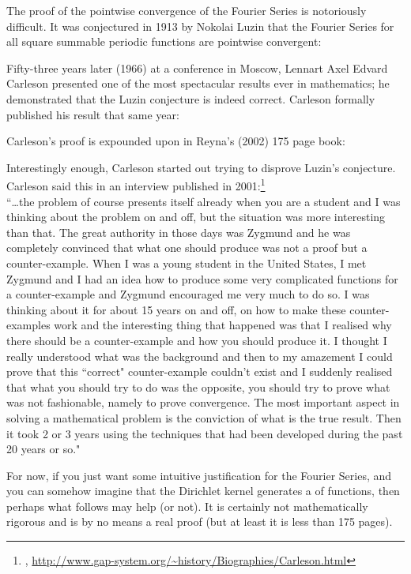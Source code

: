 \begin{proofns}
The proof of the pointwise convergence of the Fourier Series is notoriously difficult.
It was conjectured in 1913 by Nokolai Luzin that the Fourier Series for all square summable periodic functions 
are pointwise convergent:
\citePbullet\quad{}

Fifty-three years later (1966) at a conference in Moscow, Lennart Axel Edvard Carleson presented one of the most spectacular 
results ever in mathematics; he demonstrated that the Luzin conjecture is indeed correct.
Carleson formally published his result that same year:
\citePbullet\quad{}

Carleson's proof is expounded upon in Reyna's (2002) 175 page book:
\citebullet\quad{}

Interestingly enough, Carleson started out trying to disprove Luzin's conjecture.
Carleson said this in an interview published in 2001:\footnote{
  ,
  \url{http://www.gap-system.org/~history/Biographies/Carleson.html}
  }
\\
``\ldots the problem of course presents itself already when you are a student and I was thinking about the problem on and off, 
  but the situation was more interesting than that. 
  The great authority in those days was Zygmund and he was completely convinced that what one should produce was not a proof 
  but a counter-example. 
  When I was a young student in the United States, 
  I met Zygmund and I had an idea how to produce some very complicated functions for a counter-example 
  and Zygmund encouraged me very much to do so. 
  I was thinking about it for about 15 years on and off, on how to make these counter-examples work 
  and the interesting thing that happened was that I realised why there should be a counter-example and how you should produce it. 
  I thought I really understood what was the background and then to my amazement I could prove that 
  this ``correct" counter-example couldn't exist and I suddenly realised that what you should try to do was the opposite, 
  you should try to prove what was not fashionable, namely to prove convergence. 
  The most important aspect in solving a mathematical problem is the conviction of what is the true result. 
  Then it took 2 or 3 years using the techniques that had been developed during the past 20 years or so."

For now, if you just want some intuitive justification for the Fourier Series, 
and you can somehow imagine that the Dirichlet kernel generates a  of  functions,
then perhaps what follows may help (or not). It is certainly not mathematically rigorous and is by 
no means a real proof (but at least it is less than 175 pages).


\end{proofns}
